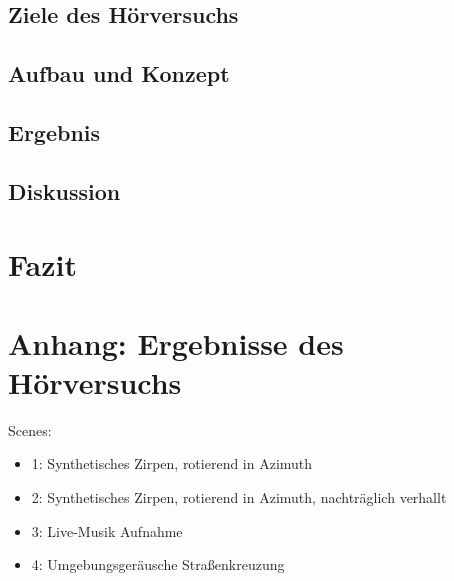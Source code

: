 \documentclass[12pt, a4paper]{article}
\begin{document}
    \subsection{Ziele des Hörversuchs}
    
    \subsection{Aufbau und Konzept}
    \label{aufbau_und_konzept}
    
    \subsection{Ergebnis}
    
    \subsection{Diskussion}
    

\section{Fazit}





\newpage
\appendix

\newpage

\section{Anhang: Ergebnisse des Hörversuchs}


Scenes:
\begin{itemize}
    \item 1: Synthetisches Zirpen, rotierend in Azimuth
    \item 2: Synthetisches Zirpen, rotierend in Azimuth, nachträglich verhallt
    \item 3: Live-Musik Aufnahme
    \item 4: Umgebungsgeräusche Straßenkreuzung
\end{itemize}
\end{document}
